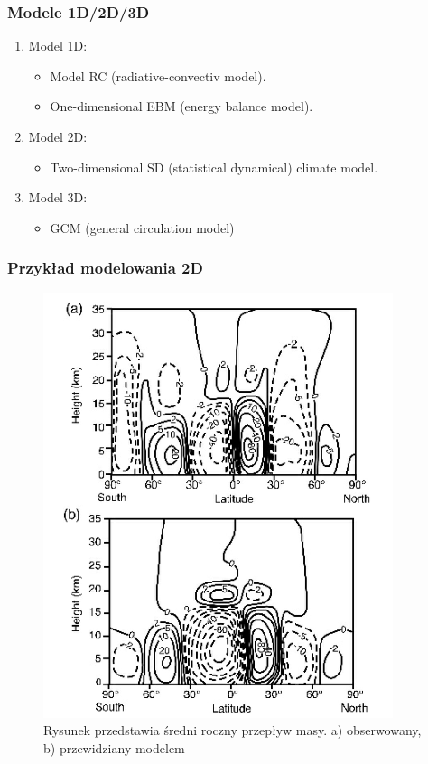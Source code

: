 \documentclass{beamer}
\begin{document}
\begin{frame}
	\frametitle{Modele 1D/2D/3D}
	\begin{enumerate}
		\item Model 1D:
		\begin{itemize}
			\item Model RC (radiative-convectiv model). %
			\item One-dimensional EBM (energy balance model). %
		\end{itemize}
		
		\item Model 2D:
		\begin{itemize}
			\item Two-dimensional SD (statistical dynamical) climate model.
		\end{itemize}
		
		\item Model 3D:
		\begin{itemize}
			\item GCM (general circulation model)
		\end{itemize}
	\end{enumerate}
	
	
	
	
\end{frame}


\begin{frame}
	\frametitle{Przykład modelowania 2D}
	
	\begin{figure}[h]
		\begin{center}
			\includegraphics[width=0.4\linewidth]{images/2D_model.png}
			\caption{Rysunek przedstawia średni roczny przepływ masy. a) obserwowany, b) przewidziany modelem}
		\end{center}
	\end{figure}
	
	
\end{frame}
\end{document}
